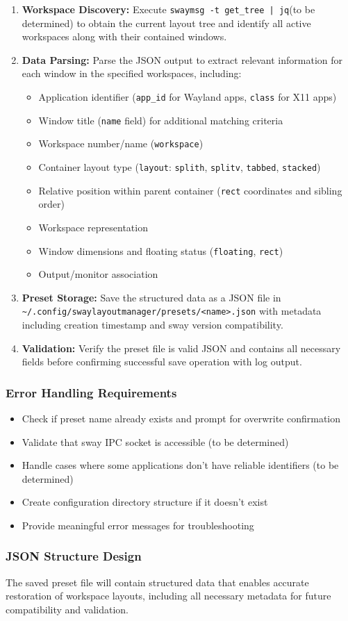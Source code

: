 \begin{enumerate}
    \item \textbf{Workspace Discovery:} Execute \texttt{swaymsg -t get\_tree | jq}(to be determined) to obtain the current layout tree and identify all active workspaces along with their contained windows.
    \item \textbf{Data Parsing:} Parse the JSON output to extract relevant information for each window in the specified workspaces, including:
    \begin{itemize}
        \item Application identifier (\texttt{app\_id} for Wayland apps, \texttt{class} for X11 apps)
        \item Window title (\texttt{name} field) for additional matching criteria
        \item Workspace number/name (\texttt{workspace})
        \item Container layout type (\texttt{layout}: \texttt{splith}, \texttt{splitv}, \texttt{tabbed}, \texttt{stacked})
        \item Relative position within parent container (\texttt{rect} coordinates and sibling order)
        \item Workspace representation
        \item Window dimensions and floating status (\texttt{floating}, \texttt{rect})
        \item Output/monitor association
    \end{itemize}
    \item \textbf{Preset Storage:} Save the structured data as a JSON file in \texttt{\~{}/.config/swaylayoutmanager/presets/<name>.json} with metadata including creation timestamp and sway version compatibility.
    \item \textbf{Validation:} Verify the preset file is valid JSON and contains all necessary fields before confirming successful save operation with log output.
\end{enumerate}

\subsubsection{Error Handling Requirements}
\begin{itemize}
    \item Check if preset name already exists and prompt for overwrite confirmation
    \item Validate that sway IPC socket is accessible (to be determined)
    \item Handle cases where some applications don't have reliable identifiers (to be determined)
    \item Create configuration directory structure if it doesn't exist
    \item Provide meaningful error messages for troubleshooting
\end{itemize}

\subsubsection{JSON Structure Design}

The saved preset file will contain structured data that enables accurate restoration of workspace layouts, including all necessary metadata for future compatibility and validation.